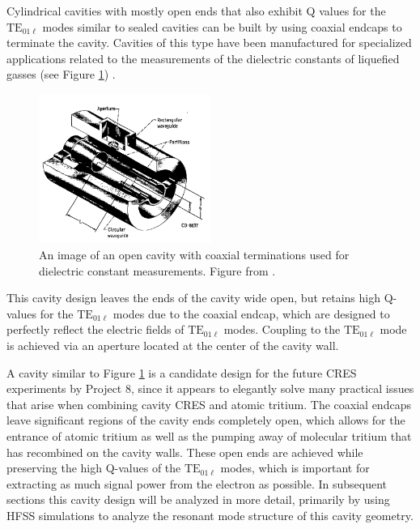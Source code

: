 Cylindrical cavities with mostly open ends that also exhibit Q values for the $\mathrm{TE}_{01\ell}$ modes similar to sealed cavities can be built by using coaxial endcaps to terminate the cavity. Cavities of this type have been manufactured for specialized applications related to the measurements of the dielectric constants of liquefied gasses (see Figure \ref{fig:chap6-open-cavity-image}) \cite{nasa_cavity_theory, nasa_cavity_measurement}.
\begin{figure}[htbp]
    \centering
    \includegraphics*[width=0.5\textwidth]{figs/Chapter-6/230606_open_cavity_image.png}
    \caption{\label{fig:chap6-open-cavity-image} An image of an open cavity with coaxial terminations used for dielectric constant measurements. Figure from \cite{nasa_cavity_measurement}.}
\end{figure}
This cavity design leaves the ends of the cavity wide open, but retains high Q-values for the $\mathrm{TE}_{01\ell}$ modes due to the coaxial endcap, which are designed to perfectly reflect the electric fields of $\mathrm{TE}_{01\ell}$ modes. Coupling to the $\mathrm{TE_{01\ell}}$ mode is achieved via an aperture located at the center of the cavity wall. 

A cavity similar to Figure \ref{fig:chap6-open-cavity-image} is a candidate design for the future CRES experiments by Project 8, since it appears to elegantly solve many practical issues that arise when combining cavity CRES and atomic tritium. The coaxial endcaps leave significant regions of the cavity ends completely open, which allows for the entrance of atomic tritium as well as the pumping away of molecular tritium that has recombined on the cavity walls. These open ends are achieved while preserving the high Q-values of the $\mathrm{TE}_{01\ell}$ modes, which is important for extracting as much signal power from the electron as possible. In subsequent sections this cavity design will be analyzed in more detail, primarily by using HFSS simulations to analyze the resonant mode structure of this cavity geometry.

